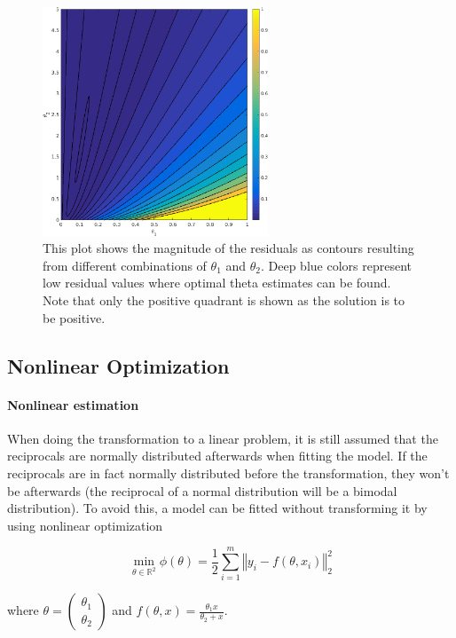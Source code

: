 \begin{figure}[htb]
\centering
\includegraphics[width=0.6\textwidth]{../img/2-2phi}
\caption{This plot shows the magnitude of the residuals as contours resulting from different combinations of $\theta_1$ and $\theta_2$. Deep blue colors represent low residual values where optimal theta estimates can be found. Note that only the positive quadrant is shown as the solution is to be positive.}
\label{fig:2-2phi}
\end{figure}

\subsection{Nonlinear Optimization}

\paragraph{Nonlinear estimation}
When doing the transformation to a linear problem, it is still assumed that the reciprocals are normally distributed afterwards when fitting the model. If the reciprocals are in fact normally distributed before the transformation, they won't be afterwards (the reciprocal of a normal distribution will be a bimodal distribution). To avoid this, a model can be fitted without transforming it by using nonlinear optimization

\begin{equation}
\min_{\theta \in \mathbb{R}^2} \phi(\theta) = \frac{1}{2} \sum_{i=1}^{m} \left\Vert y_i - f(\theta, x_i)\right\Vert_2^2
\end{equation}

where $\theta = \begin{pmatrix}
\theta_1 \\ \theta_2
\end{pmatrix}$ and $f(\theta, x) = \frac{\theta_1 x}{\theta_2 + x}$. 

